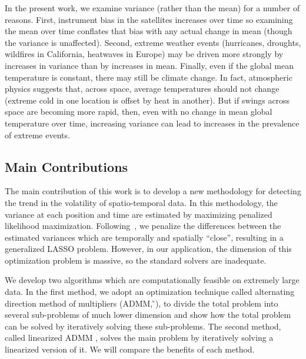 \documentclass[letterpaper]{article} %
\newcommand{\citealp}[1]
{\citeauthor{#1} ̃\citeyear{#1}}
\begin{document}
In the present work, we examine variance (rather than the mean) for a number of reasons.
First, instrument bias in the satellites increases over time so
examining the mean over time conflates that bias with any actual
change in mean (though the variance is unaffected). 
Second, extreme weather events (hurricanes, droughts, wildfires in
California, heatwaves in Europe) may be driven more strongly by increases
in variance than by increases in mean. 
Finally, even if the global mean temperature is constant, there may still
be climate change. In fact, atmospheric physics suggests that,
across space, average temperatures should not change (extreme cold
in one location is offset by heat in another). But if swings across
space are becoming more rapid, then, even with no change in mean global
temperature over time, increasing variance can lead to
increases in the prevalence of extreme events. 






\subsection{Main Contributions}

The main contribution of this work is to develop a new methodology for
detecting the trend in the volatility of spatio-temporal data. In this
methodology, the variance at each position and time are estimated by
maximizing penalized likelihood
maximization. Following~\cite{Tibshirani2014}, we penalize the 
differences between the estimated variances which
are temporally and spatially ``close'', resulting
in a generalized LASSO problem. However, in our application, the
dimension of this optimization problem is massive, so the
standard solvers are inadequate. 

We develop two algorithms
which are computationally feasible on extremely large data. In the
first method, we adopt an optimization technique 
called alternating direction method of multipliers
(ADMM, \citealp{boyd_distributed_2011}), to divide the total problem into
several sub-problems of much lower dimension and show how the total
problem can be solved by iteratively solving these sub-problems. The
second method, called linearized ADMM
\cite{parikh_proximal_2014}, solves the main problem by iteratively
solving a linearized version of it. We will compare the benefits of
each method. 
\end{document}
